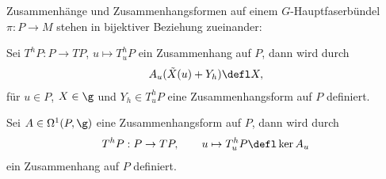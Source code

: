 \documentclass[%
	paper=a5,%
	fleqn,%
	DIV=18,%
	BCOR=0mm,
	fontsize=11pt,
	titlepage=false,%
	bibliography=totoc,
	DIV=18,%
	twoside=true,
	pdftitle=Riemannsche Geometrie,
	pdfauthor=Uwe Semmelmann,
	numbers=noendperiod]%
	{scrbook}
\begin{document}
\begin{prop}
\label{prop:Zusammenhang-Zusammenhangsform-1:1}
Zusammenhänge und Zusammenhangsformen auf einem $G$-Hauptfaserbündel
$\pi: P\to M$ stehen in bijektiver Beziehung zueinander:
\begin{propenum}
\item Sei $T^hP: P\to TP$, $u\mapsto T^h_uP$ ein Zusammenhang auf $P$, dann
wird durch
\begin{align*}
A_u(\tilde{X}(u)+Y_h) \defl X,
\end{align*}
für $u\in P$, $X\in \g$ und $Y_h \in T^h_uP$ eine Zusammenhangsform auf $P$
definiert.
\item Sei $A\in \Omega^1(P,\g)$ eine Zusammenhangsform auf $P$, dann wird durch
\begin{align*}
T^hP: P\to TP,\qquad u\mapsto T^h_uP \defl \ker A_u
\end{align*}
ein Zusammenhang auf $P$ definiert.\fish
\end{propenum}
\end{prop}
\end{document}
